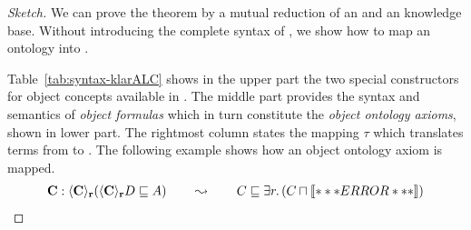 \begin{proof}[Sketch]
  We can prove the theorem by a mutual reduction of an \klarALC and an \ALCALCplus knowledge base.
  Without introducing the complete syntax of \klarALC, we show how to map an \klarALC ontology into
  \ALCALCplus.

  Table~\ref{tab:syntax-klarALC} shows in the upper part the two special constructors for object
  concepts available in \klarALC. The middle part provides the syntax and semantics of \emph{object
    formulas} which in turn constitute the \emph{object ontology axioms}, shown in lower part. The
  rightmost column states the mapping $\tau$ which translates terms from \klarALC to
  \ALCALCplus. The following example shows how an object ontology axiom is mapped.
  \begin{align*}
    \mathbf{C}:\langle \mathbf{C} \rangle_{\mathbf{r}}(\langle \mathbf{C}\rangle_{\mathbf{r}}D
    \sqsubseteq A) 
    \qquad\leadsto\qquad
    C\sqsubseteq\exists r.\left(C\sqcap\oax{\ocont{C}[r]{D}}\right)
  \end{align*}


\end{proof}
